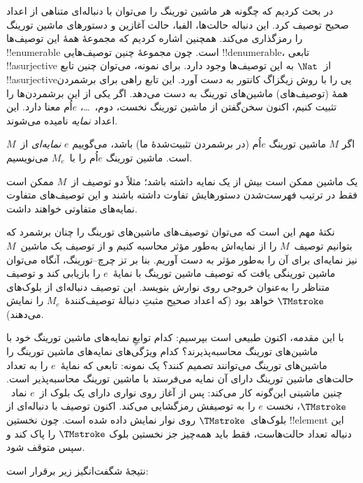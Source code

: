 \documentclass[../../../include/open-logic-section]{subfiles}
\begin{document}

در  بحث کردیم که چگونه هر ماشین تورینگ را می‌توان با
دنباله‌ای متناهی از اعداد صحیح توصیف کرد. این دنباله حالت‌ها، الفبا،
حالت آغازین و دستورهای ماشین تورینگ را رمزگذاری می‌کند. همچنین اشاره
کردیم که مجموعهٔ همهٔ این توصیف‌ها !!{enumerable} است. چون مجموعهٔ چنین
توصیف‌هایی !!{denumerable}، تابعی !!a{surjective} از~$\Nat$ به این توصیف‌ها وجود
دارد. برای نمونه، می‌توان چنین تابع !!a{surjective}یی را با روش زیگزاگ کانتور
به دست آورد. این تابع راهی برای برشمردن همهٔ (توصیف‌های) ماشین‌های
تورینگ به دست می‌دهد. اگر یکی از این برشمردن‌ها را تثبیت کنیم، اکنون
سخن‌گفتن از ماشین تورینگ نخست، دوم،~\dots، $e$اُم معنا دارد. این اعداد
\emph{نمایه} نامیده می‌شوند.

\begin{defn}
اگر $M$ ماشین تورینگ $e$اُم (در برشمردن تثبیت‌شدهٔ ما) باشد، می‌گوییم
$e$ \emph{نمایه‌ای} از~$M$ است. ماشین تورینگ $e$اُم را با~$M_e$
می‌نویسیم.
\end{defn}

یک ماشین ممکن است بیش از یک نمایه داشته باشد؛ مثلاً دو توصیف از~$M$
ممکن است فقط در ترتیب فهرست‌شدن دستورهایش تفاوت داشته باشند و این
توصیف‌های متفاوت نمایه‌های متفاوتی خواهند داشت.

نکتهٔ مهم این است که می‌توان توصیف‌های ماشین‌های تورینگ را چنان
برشمرد که بتوانیم توصیف~$M$ را از نمایه‌اش به‌طور مؤثر محاسبه کنیم و
از توصیف یک ماشین~$M$ نیز نمایه‌ای برای آن را به‌طور مؤثر به دست
آوریم. بنا بر تز چرچ--تورینگ، آنگاه می‌توان ماشین تورینگی یافت که
توصیف ماشین تورینگ با نمایهٔ~$e$ را بازیابی کند و توصیف متناظر را
به‌عنوان خروجی روی نوارش بنویسد. این توصیف دنباله‌ای از بلوک‌های
$\TMstroke$ خواهد بود (که اعداد صحیح مثبتِ دنبالهٔ توصیف‌کنندهٔ~$M_e$
را نمایش می‌دهند).

با این مقدمه، اکنون طبیعی است بپرسیم: کدام توابعِ نمایه‌های ماشین
تورینگ خود با ماشین‌های تورینگ محاسبه‌پذیرند؟ کدام ویژگی‌های نمایه‌های
ماشین تورینگ را ماشین‌های تورینگ می‌توانند تصمیم کنند؟ یک نمونه:
تابعی که نمایهٔ~$e$ را به تعداد حالت‌های ماشین تورینگ دارای آن نمایه
می‌فرستد با ماشین تورینگ محاسبه‌پذیر است. چنین ماشینی این‌گونه کار
می‌کند: پس از آغاز روی نواری دارای یک بلوک از~$e$ نماد~$\TMstroke$،
نخست $e$ را به توصیفش رمزگشایی می‌کند. اکنون توصیف با دنباله‌ای از
بلوک‌های~$\TMstroke$ روی نوار نمایش داده شده است. چون نخستین !!{element}
این دنباله تعداد حالت‌هاست، فقط باید همه‌چیز جز نخستین بلوک
$\TMstroke$ را پاک کند و سپس متوقف شود.

نتیجهٔ شگفت‌انگیز زیر برقرار است:
\end{document}

